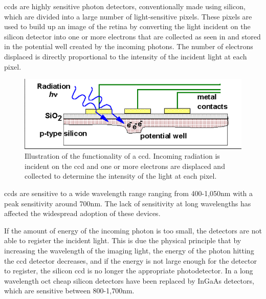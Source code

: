 \Gls{ccd}s are highly sensitive photon detectors, conventionally made using 
silicon, which are divided into a large number of light-sensitive pixels.  These 
pixels are used to build up an image of the retina by converting the light 
incident on the silicon detector into one or more electrons that are collected 
as seen in  and stored in the potential well created by the incoming 
photons. The number of electrons displaced is directly proportional to the 
intensity of the incident light at each pixel.

\begin{figure}[H]
\centering
\includegraphics{figures/CCDSchem}
\caption{Illustration of the functionality of a \Gls{ccd}.  Incoming radiation is incident on the \Gls{ccd} and one or more electrons are displaced and collected to determine the intensity of the light at each pixel. \cite{poo1} }
\label{fig:CCD}
\end{figure}

\Gls{ccd}s are sensitive to a wide wavelength range ranging from 400-1,050nm 
with a peak sensitivity around 700nm. The lack of sensitivity at long wavelengths
has affected the widespread adoption of these devices. \cite{poo2} 
 
If the amount of energy of the incoming photon is too small, the detectors are 
not able to register the incident light. This is due the physical principle that by
increasing the wavelength of the imaging light, the energy of the photon hitting
the \Gls{ccd} detector decreases, and if the energy is not large enough for the
detector to register, the silicon \Gls{ccd} is no longer the appropriate photodetector. 
In a long wavelength \Gls{oct} cheap silicon detectors have been replaced by 
InGaAs detectors, which are sensitive between 800-1,700nm.

